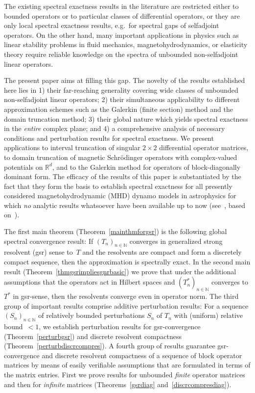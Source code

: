 \documentclass[a4paper,reqno]{amsart}
\begin{document}
{The existing spectral exactness results in the literature are restricted either  to 
bounded operators or 
to particular classes of differential operators, or
they are only local spectral exactness results, e.g.\  for spectral gaps of selfadjoint operators.
On the other hand, many important applications in physics such as linear stability problems in fluid mechanics,
magnetohydrodynamics, or elasticity theory require reliable knowledge on the spectra of unbounded non-selfadjoint linear operators.

The present paper aims at filling this gap.
The novelty of the results established here lies in
1) their far-reaching generality covering wide classes of unbounded non-self\-adjoint linear operators;
2) their simultaneous applicability to different approximation schemes such as the Galerkin (finite section) method 
and the domain truncation method;
3) their global nature which yields spectral exactness in the \emph{entire} complex plane; and
4) a comprehensive analysis of necessary conditions and perturbation results for spectral exactness.
We present applications to interval truncation of singular $2\times 2$ differential operator matrices, to domain truncation of magnetic Schr\"odinger operators with complex-valued potentials on ${\mathbb{R}}^d$, and to the Galerkin method for operators of block-diagonally dominant form.
The efficacy of the results of this paper is substantiated by the fact that they form the basis to establish spectral exactness
for all presently considered magnetohydrodynamic (MHD) dynamo models in astrophysics
for which \emph{no} analytic results whatsoever have been available up to now (see~\cite{dynamopaper},  based on~\cite[Chapter~3]{boegli-phd}).}

The first main theorem (Theorem~\ref{mainthmforgsr}) is the following global spectral convergence result:
If $(T_n)_{n\in{\mathbb{N}}}$ converges in generalized strong resolvent (gsr) sense to~$T$ and the resolvents are compact and form a discretely compact sequence,
then the approximation is spectrally exact.
In the second main result  (Theorem~\ref{thmgsrimpliesgnrbasic}) we prove that under the additional assumptions that the operators act in Hilbert spaces and $(T_n^*)_{n\in{\mathbb{N}}}$ converges to $T^*$ in gsr-sense, then the resolvents converge even in operator norm. 
The third group of important results comprise additive perturbation results:
For a sequence $(S_n)_{n\in{\mathbb{N}}}$ of relatively bounded perturbations $S_n$ of $T_n$ with (uniform) relative bound~$<1$,
we establish perturbation results for gsr-convergence (Theorem~\ref{perturbgsr})
and discrete resolvent compactness (Theorem~\ref{perturbdiscrcompres}).
A fourth group of results guarantee gsr-convergence and discrete resolvent compactness of a sequence of block operator matrices
by means of easily verifiable assumptions that are formulated in terms of the matrix entries. 
First we prove results for unbounded \emph{finite} operator matrices 
and then for \emph{infinite} matrices (Theorems~\ref{gsrdiag} and~\ref{discrcompresdiag}).
 
\end{document}
